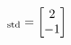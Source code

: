 \documentclass[preview]{standalone}
\begin{document}
\begin{align*}
[\vec u]_{\rm std}=\begin{bmatrix}2\\-1\end{bmatrix}
\end{align*}
\end{document}
